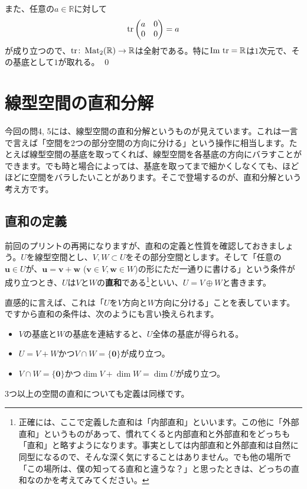 また、任意の$a \in \mathbb{R}$に対して
\[
\operatorname{tr}
\begin{pmatrix}
a & 0 \\
0 & 0
\end{pmatrix}
=
a
\]
が成り立つので、$\operatorname{tr}\colon \operatorname{Mat}_2(\mathbb{R}) \rightarrow \mathbb{R}$は全射である。特に$\mathrm{Im}\, \operatorname{tr} = \mathbb{R}$は$1$次元で、その基底として$1$が取れる。 \qed

\section{線型空間の直和分解}

今回の問4, 5には、線型空間の直和分解というものが見えています。これは一言で言えば「空間を$2$つの部分空間の方向に分ける」という操作に相当します。たとえば線型空間の基底を取ってくれば、線型空間を各基底の方向にバラすことができます。でも時と場合によっては、基底を取ってまで細かくしなくても、ほどほどに空間をバラしたいことがあります。そこで登場するのが、直和分解という考え方です。

\subsection{直和の定義}

前回のプリントの再掲になりますが、直和の定義と性質を確認しておきましょう。$U$を線型空間とし、$V, W\subset U$をその部分空間とします。そして「任意の$\bm{u} \in U$が、$\bm{u} = \bm{v} + \bm{w}$ ($\bm{v} \in V, \bm{w}\in W$)の形にただ一通りに書ける」という条件が成り立つとき、$U$は$V$と$W$の\textbf{直和}である\footnote{正確には、ここで定義した直和は「内部直和」といいます。この他に「外部直和」というものがあって、慣れてくると内部直和と外部直和をどっちも「直和」と略すようになります。事実としては内部直和と外部直和は自然に同型になるので、そんな深く気にすることはありません。でも他の場所で「この場所は、僕の知ってる直和と違うな？」と思ったときは、どっちの直和なのかを考えてみてください。}といい、$U = V \oplus W$と書きます。

直感的に言えば、これは「$U$を$V$方向と$W$方向に分ける」ことを表しています。ですから直和の条件は、次のようにも言い換えられます。
\begin{itemize}
\item $V$の基底と$W$の基底を連結すると、$U$全体の基底が得られる。
\item $U = V + W$かつ$V\cap W = \{\bm{0}\}$が成り立つ。
\item $V \cap W = \{\bm{0}\}$かつ$\dim V + \dim W = \dim U$が成り立つ。
\end{itemize}
$3$つ以上の空間の直和についても定義は同様です。

